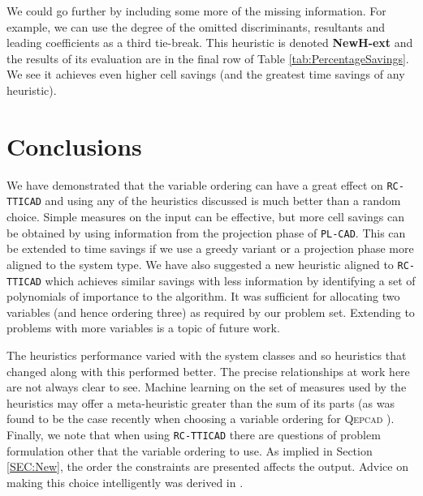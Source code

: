 \documentclass[runningheads,a4paper]{llncs}
\begin{document}
We could go further by including some more of the missing information.  For example, we can use the degree of the omitted discriminants, resultants and leading coefficients as a third tie-break.  This heuristic is denoted \textbf{NewH-ext} and the results of its evaluation are in the final row of Table \ref{tab:PercentageSavings}.  We see it achieves even higher cell savings (and the greatest time savings of any heuristic).

\section{Conclusions}
\label{SEC:Conclusions}

We have demonstrated that the variable ordering can have a great effect on \texttt{RC-TTICAD} and using any of the heuristics discussed is much better than a random choice.  Simple measures on the input can be effective, but more cell savings can be obtained by using information from the projection phase of \texttt{PL-CAD}.  This can be extended to time savings if we use a greedy variant or a projection phase more aligned to the system type.  
We have also suggested a new heuristic aligned to \texttt{RC-TTICAD} which achieves similar savings with less information by identifying a set of polynomials of importance to the algorithm.  It was sufficient for allocating two variables (and hence ordering three) as required by our problem set.  Extending to problems with more variables is a topic of future work.  

The heuristics performance varied with the system classes and so heuristics that changed along with this performed better.  The precise relationships at work here are not always clear to see.  Machine learning on the set of measures used by the heuristics may offer a meta-heuristic greater than the sum of its parts (as was found to be the case recently when choosing a variable ordering for \textsc{Qepcad} \cite{HEWDPB14}).  
Finally, we note that when using \texttt{RC-TTICAD} there are questions of problem formulation other that the variable ordering to use.  As implied in Section \ref{SEC:New}, the order the constraints are presented affects the output.  Advice on making this choice intelligently was derived in \cite{EBCDMW14}.  
\end{document}
